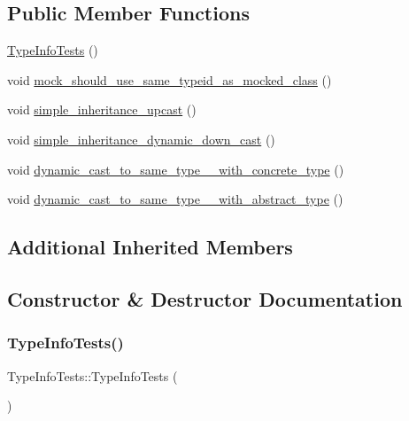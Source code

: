\subsection*{Public Member Functions}
\begin{DoxyCompactItemize}
\item 
\mbox{\hyperlink{structTypeInfoTests_acba562fb8dadc02c1c1461408e418870}{Type\+Info\+Tests}} ()
\item 
void \mbox{\hyperlink{structTypeInfoTests_af076fa686f8eb3ff61951834096f8212}{mock\+\_\+should\+\_\+use\+\_\+same\+\_\+typeid\+\_\+as\+\_\+mocked\+\_\+class}} ()
\item 
void \mbox{\hyperlink{structTypeInfoTests_a052d271864fb921c8d0e6908207e1db6}{simple\+\_\+inheritance\+\_\+upcast}} ()
\item 
void \mbox{\hyperlink{structTypeInfoTests_a7e0450f4df5ceb49ced532ace7e565aa}{simple\+\_\+inheritance\+\_\+dynamic\+\_\+down\+\_\+cast}} ()
\item 
void \mbox{\hyperlink{structTypeInfoTests_a519bea256146957124b0c48aaade1c9a}{dynamic\+\_\+cast\+\_\+to\+\_\+same\+\_\+type\+\_\+\+\_\+with\+\_\+concrete\+\_\+type}} ()
\item 
void \mbox{\hyperlink{structTypeInfoTests_ac4ed5f247172e73ec1a4eadea71a1ea7}{dynamic\+\_\+cast\+\_\+to\+\_\+same\+\_\+type\+\_\+\+\_\+with\+\_\+abstract\+\_\+type}} ()
\end{DoxyCompactItemize}
\subsection*{Additional Inherited Members}


\subsection{Constructor \& Destructor Documentation}
\mbox{\label{structTypeInfoTests_acba562fb8dadc02c1c1461408e418870}} 
\subsubsection{\texorpdfstring{TypeInfoTests()}{TypeInfoTests()}}
{\footnotesize\ttfamily Type\+Info\+Tests\+::\+Type\+Info\+Tests (\begin{DoxyParamCaption}{ }\end{DoxyParamCaption})\hspace{0.3cm}{\ttfamily [inline]}}



